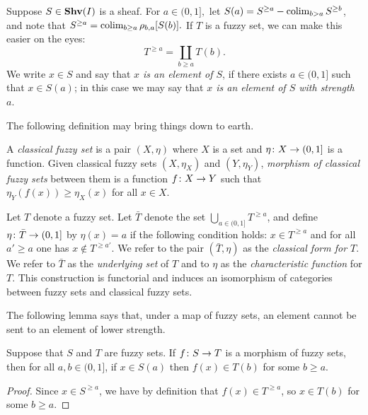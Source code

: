 \documentclass{amsart}
\def\Shv{\She}
\begin{document}
Suppose $S\in\Shv(I)$ is a sheaf.   For $a\in (0,1],$ let $S(a)=S^{\geq a}-\mathop{\textnormal{colim}}_{b>a}S^{\geq b}$, and note that $S^{\geq a}=\mathop{\textnormal{colim}}_{b\geq a}\rho_{b,a}[S(b)].$  If $T$ is a fuzzy set, we can make this easier on the eyes: $$T^{\geq a}=\coprod_{b\geq a}T(b).$$  We write $x\in S$ and say that {\em $x$ is an element of $S$}, if there exists $a\in (0,1]$ such that $x\in S(a)$; in this case we may say that {\em $x$ is an element of $S$ with strength $a$}.

The following definition may bring things down to earth.

\begin{definition}

A {\em classical  fuzzy set} is a pair $(X,\eta)$ where $X$ is a set and $\eta\colon X\rightarrow(0,1]$ is a function.   Given classical fuzzy sets $(X,\eta_X)$ and $(Y,\eta_Y)$, {\em morphism of classical fuzzy sets} between them is a function $f\colon X\rightarrow Y$ such that $\eta_Y(f(x))\geq\eta_X(x)$ for all $x\in X$.

Let $T$ denote a fuzzy set.  Let $\bar{T}$ denote the set $\bigcup_{a\in (0,1]} T^{\geq a}$, and define $\eta\colon\bar{T}\rightarrow(0,1]$ by $\eta(x)=a$ if the following condition holds: $x\in T^{\geq a}$ and for all $a'\geq a$ one has $x\not\in T^{\geq a'}$.  We refer to the pair $(\bar{T},\eta)$ as the {\em classical form for $T$}.  We refer to $\bar{T}$ as the {\em underlying set} of $T$ and to $\eta$ as the {\em characteristic function} for $T$.  This construction is functorial and induces an isomorphism of categories between fuzzy sets and classical fuzzy sets.

\end{definition}

The following lemma says that, under a map of fuzzy sets, an element cannot be sent to an element of lower strength.

\begin{lemma}

Suppose that $S$ and $T$ are fuzzy sets.  If $f\colon S\rightarrow T$ is a morphism of fuzzy sets, then for all $a,b\in (0,1]$, if $x\in S(a)$ then $f(x)\in T(b)$ for some $b\geq a$.

\end{lemma}

\begin{proof}

Since $x\in S^{\geq a}$, we have by definition that $f(x)\in T^{\geq a}$, so $x\in T(b)$ for some $b\geq a$.

\end{proof}
\end{document}
